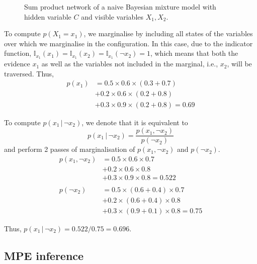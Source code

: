 \documentclass{article}
\newcommand{\giv}{\,|\,}
\begin{document}
\begin{figure}[H]
    \caption{Sum product network of a naive Bayesian mixture model with hidden variable $C$ and visible variables $X_1, X_2$.}
    \label{fig:SPN2}
\end{figure}

\noindent To compute $p(X_1 = x_1)$, we marginalise by including all states of the variables over which we marginalise in the configuration. In this case, due to the indicator function, $\mathbb{I}_{x_1}(x_1) = \mathbb{I}_{x_1}(x_2) = \mathbb{I}_{x_1}(\neg x_2) = 1$, which means that both the evidence $x_1$ as well as the variables not included in the marginal, i.e., $x_2$, will be traversed. Thus, 
\begin{align*}
    p(x_1) &= 0.5 \times 0.6 \times (0.3 + 0.7) \\
    &+ 0.2 \times 0.6 \times (0.2 + 0.8) \\
    &+ 0.3 \times 0.9 \times (0.2 + 0.8) = 0.69
\end{align*}

\noindent To compute $p(x_1 \giv \neg x_2)$, we denote that it is equivalent to 
$$
    p(x_1 \giv \neg x_2) = \frac{p(x_1, \neg x_2)}{p(\neg x_2)}
$$
\noindent and perform 2 passes of marginalisation of $p(x_1, \neg x_2)$ and $p(\neg x_2)$. 
\begin{align*}
    p(x_1, \neg x_2) &= 0.5 \times 0.6 \times 0.7 \\
    &+ 0.2 \times 0.6 \times 0.8 \\
    &+ 0.3 \times 0.9 \times 0.8 = 0.522\\\\
    p(\neg x_2) &= 0.5 \times (0.6 + 0.4) \times 0.7 \\
    &+ 0.2 \times (0.6 + 0.4) \times 0.8 \\
    &+ 0.3 \times (0.9 + 0.1) \times 0.8 = 0.75
\end{align*}

\noindent Thus, $p(x_1 \giv \neg x_2) = 0.522/0.75 = 0.696$. 

\subsection{MPE inference}
\end{document}
